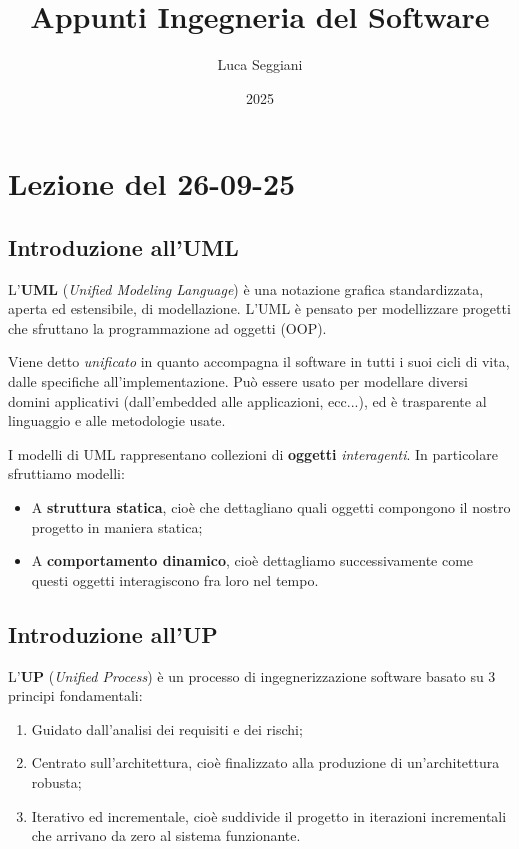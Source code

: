 \documentclass[a4paper,11pt]{article}
\title{Appunti Ingegneria del Software}
\author{Luca Seggiani}
\date{2025}
\begin{document}
\section{Lezione del 26-09-25}

\thispagestyle{empty}
\pagestyle{fancy}

\subsection{Introduzione all'UML}
L'\textbf{UML} (\textit{Unified Modeling Language}) è una notazione grafica standardizzata, aperta ed estensibile, di modellazione. 
L'UML è pensato per modellizzare progetti che sfruttano la programmazione ad oggetti (OOP).

Viene detto \textit{unificato} in quanto accompagna il software in tutti i suoi cicli di vita, dalle specifiche all'implementazione.
Può essere usato per modellare diversi domini applicativi (dall'embedded alle applicazioni, ecc...), ed è trasparente al linguaggio e alle metodologie usate.

I modelli di UML rappresentano collezioni di \textbf{oggetti} \textit{interagenti}. In particolare sfruttiamo modelli:
\begin{itemize}
	\item A \textbf{struttura statica}, cioè che dettagliano quali oggetti compongono il nostro progetto in maniera statica;
	\item A \textbf{comportamento dinamico}, cioè dettagliamo successivamente come questi oggetti interagiscono fra loro nel tempo.
\end{itemize}

\subsection{Introduzione all'UP}
L'\textbf{UP} (\textit{Unified Process}) è un processo di ingegnerizzazione software basato su 3 principi fondamentali:
\begin{enumerate}
	\item Guidato dall'analisi dei requisiti e dei rischi;
	\item Centrato sull'architettura, cioè finalizzato alla produzione di un'architettura robusta;
	\item Iterativo ed incrementale, cioè suddivide il progetto in iterazioni incrementali che arrivano da zero al sistema funzionante.
\end{enumerate}
\end{document}
